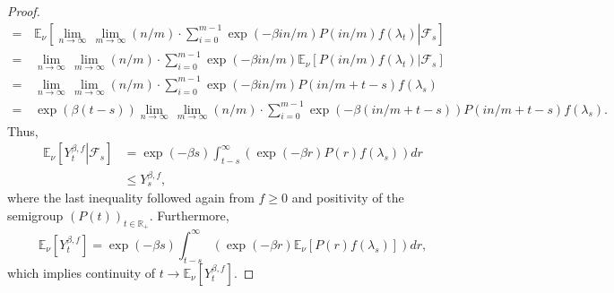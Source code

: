 \documentclass[a4paper,12pt]{article}
\theoremstyle{definition}
\theoremstyle{remark}
\numberwithin{equation}{section}
\numberwithin{theorem}{section}
\begin{document}
\begin{proof}
\begin{align*}
 = \,& \mathbb{E}_{\nu}\left[\left.\underset{n\rightarrow\infty}{\lim}\,\underset{m\rightarrow\infty}{\lim}\left(n/m\right)\cdot{\sum_{i=0}^{m-1}}\exp\left(-\beta in/m\right)P(in/m)f(\lambda_{t})\right|\mathcal{F}_{s}\right]\\
  = \,& \underset{n\rightarrow\infty}{\lim}\,\underset{m\rightarrow\infty}{\lim}\left(n/m\right)\cdot{\sum_{i=0}^{m-1}}\exp\left(-\beta in/m\right)\mathbb{E}_{\nu}\left[\left.P(in/m)f(\lambda_{t})\right|\mathcal{F}_{s}\right]\\
  = \,& \underset{n\rightarrow\infty}{\lim}\,\underset{m\rightarrow\infty}{\lim}\left(n/m\right)\cdot{\sum_{i=0}^{m-1}}\exp\left(-\beta in/m\right)P(in/m+t-s)f(\lambda_{s})\\
  = \,& \exp\left(\beta\left(t-s\right)\right)\underset{n\rightarrow\infty}{\lim}\,\underset{m\rightarrow\infty}{\lim}\left(n/m\right)\cdot{\sum_{i=0}^{m-1}}\exp\left(-\beta\left(in/m+t-s\right)\right)P(in/m+t-s)f(\lambda_{s}).
\end{align*}
Thus, 
\begin{align*}
\mathbb{E}_{\nu}\left[\left.Y_{t}^{\beta,f}\right|\mathcal{F}_{s}\right] & =\exp\left(-\beta s\right)\int_{t-s}^{\infty}\left(\exp\left(-\beta r\right)P(r)f(\lambda_{s})\right)dr\\
 & \leq Y_{s}^{\beta,f},
\end{align*}
where the last inequality followed again from $f\geq0$ and positivity of the
semigroup $\left(P(t)\right)_{t\in\mathbb{R}_{+}}$. Furthermore,
\[
\mathbb{E}_{\nu}\left[Y_{t}^{\beta,f}\right]=\exp\left(-\beta s\right)\int_{t-s}^{\infty}\left(\exp\left(-\beta r\right)\mathbb{E}_{\nu}\left[P(r)f(\lambda_{s})\right]\right)dr,
\]
which implies continuity of 
$
t\rightarrow\mathbb{E}_{\nu}\left[Y_{t}^{\beta,f}\right].
$



\end{proof}
\end{document}
